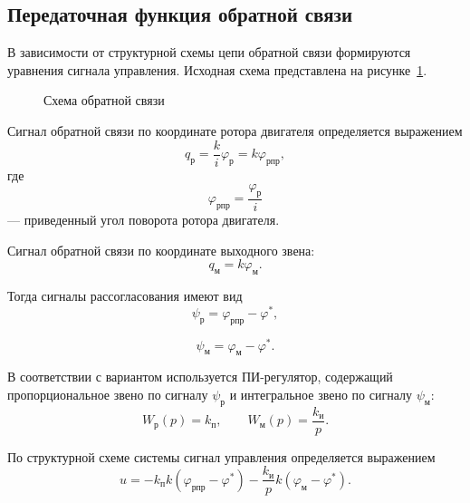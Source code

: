 \subsection{Передаточная функция обратной связи}

В зависимости от структурной схемы цепи обратной связи формируются уравнения сигнала управления. Исходная схема представлена на рисунке~\ref{fig:feedback_scheme}.

\begin{figure}[H]
    \centering
    
    \caption{Схема обратной связи}
    \label{fig:feedback_scheme}
\end{figure}

Сигнал обратной связи по координате ротора двигателя определяется выражением
\begin{equation}
    q_{\text{р}}
    =
    \frac{k}{i}\varphi_{\text{р}}
    =
    k\varphi_{\text{рпр}},
\end{equation}
где
\begin{equation}
    \varphi_{\text{рпр}}
    =
    \frac{\varphi_{\text{р}}}{i}
\end{equation}
--- приведенный угол поворота ротора двигателя.

Сигнал обратной связи по координате выходного звена:
\begin{equation}
    q_{\text{м}}
    =
    k\varphi_{\text{м}}.
\end{equation}

Тогда сигналы рассогласования имеют вид
\begin{equation}
    \psi_{\text{р}}
    =
    \varphi_{\text{рпр}}-\varphi^*,
\end{equation}

\begin{equation}
    \psi_{\text{м}}
    =
    \varphi_{\text{м}}-\varphi^*.
\end{equation}

В соответствии с вариантом используется ПИ-регулятор, содержащий пропорциональное звено по сигналу $\psi_{\text{р}}$ и интегральное звено по сигналу $\psi_{\text{м}}$:
\begin{equation}
    W_{\text{р}}(p)=k_{\text{п}},
    \qquad
    W_{\text{м}}(p)=\frac{k_{\text{и}}}{p}.
\end{equation}

По структурной схеме системы сигнал управления определяется выражением
\begin{equation}
    u
    =
    -
    k_{\text{п}}k
    \left(
        \varphi_{\text{рпр}}-\varphi^*
    \right)
    -
    \frac{k_{\text{и}}}{p}
    k
    \left(
        \varphi_{\text{м}}-\varphi^*
    \right).
\end{equation}

